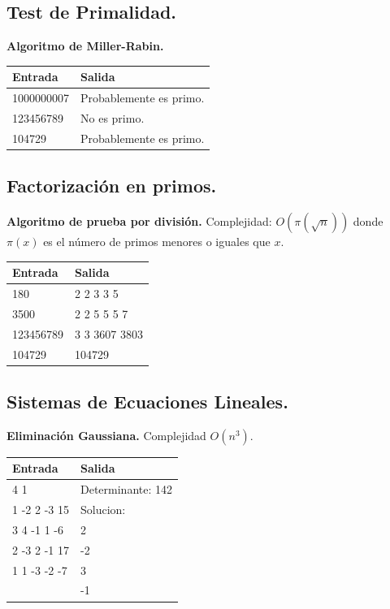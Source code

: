 \documentclass[10pt, letterpaper, twoside]{article}
\begin{document}
\subsection{Test de Primalidad.}

\textbf{Algoritmo de Miller-Rabin.}

 

\begin{tabular}{|p{7cm}|p{7cm}|}
\hline
\textbf{Entrada} & \textbf{Salida}\\ \hline
1000000007 & Probablemente es primo.\\
123456789  & No es primo.\\
104729     & Probablemente es primo.\\ \hline
\end{tabular}\bigskip

\subsection{Factorización en primos.}

\textbf{Algoritmo de prueba por división.} Complejidad: $O\left(\pi\left(\sqrt{n}\right)\right)$ donde $\pi(x)$ es el número de primos menores o iguales que $x$.



\begin{tabular}{|p{7cm}|p{7cm}|}
\hline
\textbf{Entrada} & \textbf{Salida}\\ \hline
180       & 2 2 3 3 5\\
3500      & 2 2 5 5 5 7\\ 
123456789 & 3 3 3607 3803\\
104729    & 104729\\ \hline
\end{tabular}\bigskip

\subsection{Sistemas de Ecuaciones Lineales.}

\textbf{Eliminación Gaussiana.} Complejidad $O(n^3)$.



\begin{tabular}{|p{7cm}|p{7cm}|}
\hline
\textbf{Entrada} & \textbf{Salida}\\ \hline
4 1          & Determinante: 142\\
1 -2 2 -3 15 & Solucion:\\ 
3 4 -1 1 -6  & 2\\ 
2 -3 2 -1 17 & -2\\ 
1 1 -3 -2 -7 & 3\\ 
             & -1\\ \hline
\end{tabular}\bigskip
\end{document}
